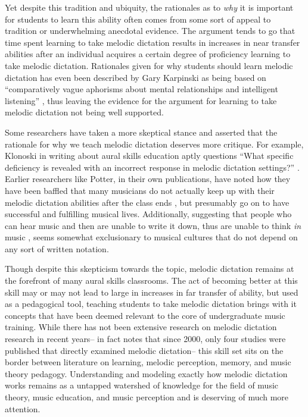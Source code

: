 \documentclass[]{book}
\begin{document}
Yet despite this tradition and ubiquity, the rationales as to \emph{why} it is important for students to learn this ability often comes from some sort of appeal to tradition or underwhelming anecdotal evidence.
The argument tends to go that time spent learning to take melodic dictation results in increases in near transfer abilities after an individual acquires a certain degree of proficiency learning to take melodic dictation.
Rationales given for why students should learn melodic dictation has even been described by Gary Karpinski as being based on ``comparatively vague aphorisms about mental relationships and intelligent listening'' \citep[p.192]{karpinskiModelMusicPerception1990}, thus leaving the evidence for the argument for learning to take melodic dictation not being well supported.

Some researchers have taken a more skeptical stance and asserted that the rationale for why we teach melodic dictation deserves more critique.
For example, Klonoski in writing about aural skills education aptly questions ``What specific deficiency is revealed with an incorrect response in melodic dictation settings?'' \citep{klonoskiImprovingDictationAuralSkills2006}.
Earlier researchers like Potter, in their own publications, have noted how they have been baffled that many musicians do not actually keep up with their melodic dictation abilities after the class ends \citep{potterIdentifyingSucessfulDictation1990}, but presumably go on to have successful and fulfilling musical lives.
Additionally, suggesting that people who can hear music and then are unable to write it down, thus are unable to think \emph{in} music \citep{karpinskiAuralSkillsAcquisition2000}, seems somewhat exclusionary to musical cultures that do not depend on any sort of written notation.

Though despite this skepticism towards the topic, melodic dictation remains at the forefront of many aural skills classrooms.
The act of becoming better at this skill may or may not lead to large in increases in far transfer of ability, but used as a pedagogical tool, teaching students to take melodic dictation brings with it concepts that have been deemed relevant to the core of undergraduate music training.
While there has not been extensive research on melodic dictation research in recent years-- in fact \citet{paneyEffectDirectingAttention2016} notes that since 2000, only four studies were published that directly examined melodic dictation-- this skill set sits on the border between literature on learning, melodic perception, memory, and music theory pedagogy.
Understanding and modeling exactly how melodic dictation works remains as a untapped watershed of knowledge for the field of music theory, music education, and music perception and is deserving of much more attention.
\end{document}
